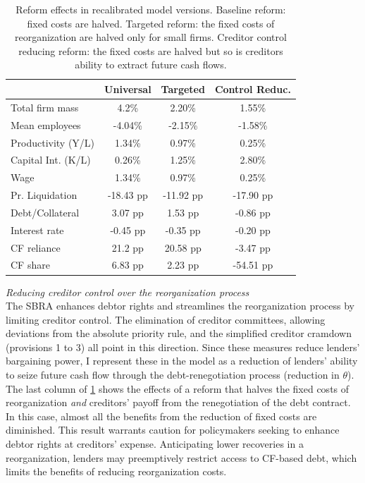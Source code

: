 \documentclass[12pt]{article}
\begin{document}
\begin{table}[H]
    \centering
    \begin{tabular}{lccc}
     & \textbf{Universal} & \textbf{Targeted} & \textbf{Control Reduc.} \\    
    \toprule
    Total firm mass & 4.2\%  & 2.20\% & 1.55\%  \\  
    Mean employees & -4.04\%  & -2.15\% & -1.58\%   \\  
    Productivity (Y/L) & 1.34\%  & 0.97\% & 0.25\%  \\  
    Capital Int. (K/L) & 0.26\%  & 1.25\% & 2.80\%  \\  
    Wage & 1.34\%  & 0.97\% & 0.25\%  \vspace{2mm}  \\  
    Pr. Liquidation & -18.43 pp  & -11.92 pp & -17.90 pp \\  
    Debt/Collateral & 3.07 pp  &  1.53 pp & -0.86 pp  \\  
    Interest rate & -0.45 pp  & -0.35 pp & -0.20 pp  \\  
    CF reliance & 21.2 pp  & 20.58 pp & -3.47 pp  \\    
    CF share & 6.83 pp  & 2.23 pp & -54.51 pp  \\  
    \bottomrule
    \end{tabular}
    \caption{\small Reform effects in recalibrated model versions. Baseline reform: fixed costs are halved. Targeted reform: the fixed costs of reorganization are halved only for small firms. Creditor control reducing reform: the fixed costs are halved but so is creditors ability to extract future cash flows.}
    \label{tab:percentage_changes2}
\end{table}

\noindent \textit{Reducing creditor control over the reorganization process} \\
The SBRA enhances debtor rights and streamlines the reorganization process by limiting creditor control. The elimination of creditor committees, allowing deviations from the absolute priority rule, and the simplified creditor cramdown (provisions 1 to 3) all point in this direction. Since these measures reduce lenders' bargaining power, I represent these in the model as a reduction of lenders' ability to seize future cash flow through the debt-renegotiation process (reduction in $\theta$). The last column of \ref{tab:percentage_changes2} shows the effects of a reform that halves the fixed costs of reorganization \textit{and} creditors' payoff from the renegotiation of the debt contract. In this case, almost all the benefits from the reduction of fixed costs are diminished. This result warrants caution for policymakers seeking to enhance debtor rights at creditors' expense. Anticipating lower recoveries in a reorganization, lenders may preemptively restrict access to CF-based debt, which limits the benefits of reducing reorganization costs. 
\end{document}
